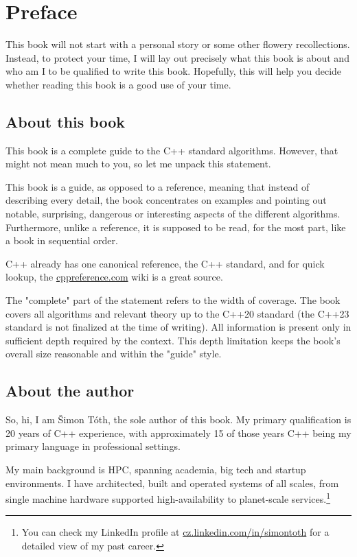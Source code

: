 \chapter{Preface}

This book will not start with a personal story or some other flowery recollections. Instead, to protect your time, I will lay out precisely what this book is about and who am I to be qualified to write this book. Hopefully, this will help you decide whether reading this book is a good use of your time.

\section*{About this book}

This book is a complete guide to the C++ standard algorithms. However, that might not mean much to you, so let me unpack this statement.

This book is a guide, as opposed to a reference, meaning that instead of describing every detail, the book concentrates on examples and pointing out notable, surprising, dangerous or interesting aspects of the different algorithms. Furthermore, unlike a reference, it is supposed to be read, for the most part, like a book in sequential order.

C++ already has one canonical reference, the C++ standard, and for quick lookup, the \url{cppreference.com} wiki is a great source.

The "complete" part of the statement refers to the width of coverage. The book covers all algorithms and relevant theory up to the C++20 standard (the C++23 standard is not finalized at the time of writing). All information is present only in sufficient depth required by the context. This depth limitation keeps the book's overall size reasonable and within the "guide" style.

\section*{About the author}

So, hi, I am Šimon Tóth, the sole author of this book. My primary qualification is 20 years of C++ experience, with approximately 15 of those years C++ being my primary language in professional settings.

My main background is HPC, spanning academia, big tech and startup environments. I have architected, built and operated systems of all scales, from single machine hardware supported high-availability to planet-scale services.\footnote{You can check my LinkedIn profile at \url{cz.linkedin.com/in/simontoth} for a detailed view of my past career.}

